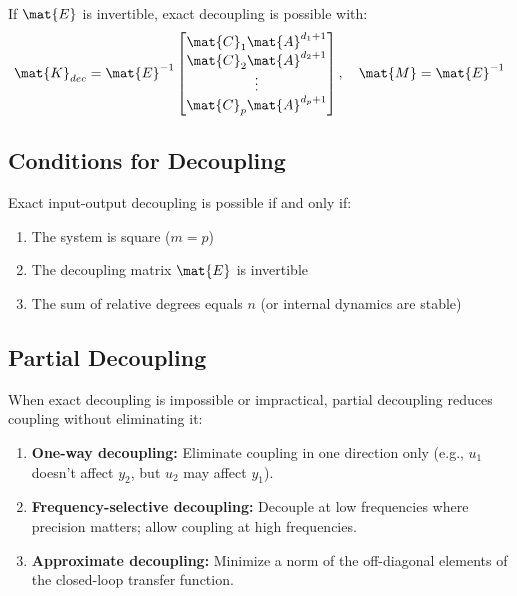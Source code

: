 If $\mat{E}$ is invertible, exact decoupling is possible with:
\begin{equation}
\mat{K}_{dec} = \mat{E}^{-1}\begin{bmatrix}
\mat{C}_1\mat{A}^{d_1+1} \\
\mat{C}_2\mat{A}^{d_2+1} \\
\vdots \\
\mat{C}_p\mat{A}^{d_p+1}
\end{bmatrix}, \quad
\mat{M} = \mat{E}^{-1}
\label{eq:decoupling_gains}
\end{equation}

\subsection{Conditions for Decoupling}

Exact input-output decoupling is possible if and only if:
\begin{enumerate}
    \item The system is square ($m = p$)
    \item The decoupling matrix $\mat{E}$ is invertible
    \item The sum of relative degrees equals $n$ (or internal dynamics are stable)
\end{enumerate}


\subsection{Partial Decoupling}

When exact decoupling is impossible or impractical, partial decoupling reduces coupling without eliminating it:

\begin{enumerate}
    \item \textbf{One-way decoupling:} Eliminate coupling in one direction only (e.g., $u_1$ doesn't affect $y_2$, but $u_2$ may affect $y_1$).

    \item \textbf{Frequency-selective decoupling:} Decouple at low frequencies where precision matters; allow coupling at high frequencies.

    \item \textbf{Approximate decoupling:} Minimize a norm of the off-diagonal elements of the closed-loop transfer function.
\end{enumerate}

